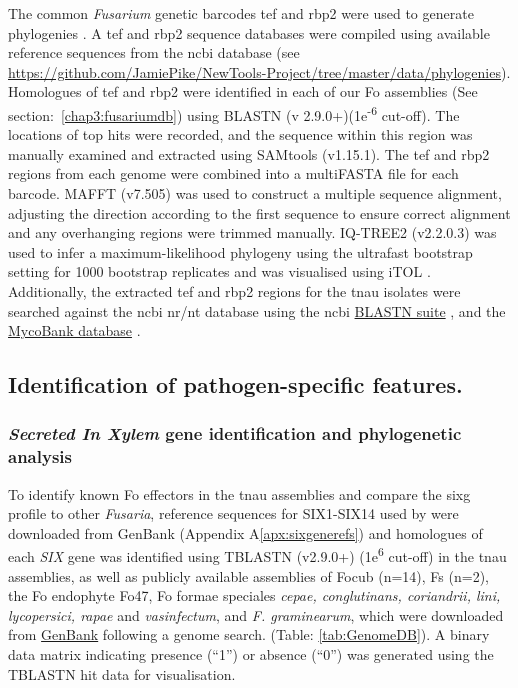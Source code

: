 The common \textit{Fusarium} genetic barcodes \acf{tef} and \acf{rbp2} were used to generate phylogenies \parencite{Edel-Hermann2019}. A \ac{tef} and \ac{rbp2} sequence databases were compiled using available reference sequences from the \ac{ncbi} database (see \href{https://github.com/JamiePike/NewTools-Project/tree/master/data/phylogenies}{https://github.com/JamiePike/NewTools-Project/tree/m\-aster/data/phylogenies}). Homologues of \ac{tef} and \ac{rbp2} were identified in each of our \ac{Fo} assemblies (See section:~\ref{chap3:fusariumdb}) using BLASTN (v 2.9.0+)(1e\textsuperscript{-6} cut-off). The locations of top hits were recorded, and the sequence within this region was manually examined and extracted using SAMtools (v1.15.1). The \ac{tef} and \ac{rbp2} regions from each genome were combined into a multiFASTA file for each barcode. MAFFT (v7.505) \parencite{Katoh2019} was used to construct a multiple sequence alignment, adjusting the direction according to the first sequence to ensure correct alignment and any overhanging regions were trimmed manually. IQ-TREE2 (v2.2.0.3) \parencite{Nguyen2015} was used to infer a maximum-likelihood phylogeny using the ultrafast bootstrap setting for 1000 bootstrap replicates and was visualised using iTOL \parencite{Letunic2021}. Additionally, the extracted \ac{tef} and \ac{rbp2} regions for the \ac{tnau} isolates were searched against the \ac{ncbi} nr/nt database using the  \ac{ncbi} \href{https://blast.ncbi.nlm.nih.gov/Blast.cgi?PROGRAM=blastn&BLAST_SPEC=GeoBlast&PAGE_TYPE=BlastSearch}{BLASTN suite} \parencite{Nih2014}, and the \href{https://fusarium.mycobank.org/page/Fusarium_table}{MycoBank database} \parencite{Robert2013}. 

\subsection{Identification of pathogen-specific features.}

\subsubsection{\textit{Secreted In Xylem} gene identification and phylogenetic analysis}
\label{chap1:tnauSIXgenePhylo}
To identify known \acs{Fo} effectors in the \ac{tnau} assemblies and compare the \ac{sixg} profile to other \textit{Fusaria}, reference sequences for SIX1-SIX14 used by \textcite{Czislowski2018} were downloaded from GenBank (Appendix A\ref{apx:sixgenerefs}) and homologues of each \textit{SIX} gene was identified using TBLASTN (v2.9.0+) (1e\textsuperscript{6} cut-off) in the \ac{tnau} assemblies, as well as publicly available assemblies of \ac{Focub} (n=14), \ac{Fs} (n=2), the \ac{Fo} endophyte Fo47, \ac{Fo} formae speciales \textit{cepae, conglutinans, coriandrii, lini, lycopersici,  rapae} and \textit{vasinfectum}, and \textit{F. graminearum}, which were downloaded from \href{https://www.ncbi.nlm.nih.gov/data-hub/genome/}{GenBank} following a genome search. (Table: \ref{tab:GenomeDB}). A binary data matrix indicating presence (“1”) or absence (“0”) was generated using  the TBLASTN hit data for visualisation. 

